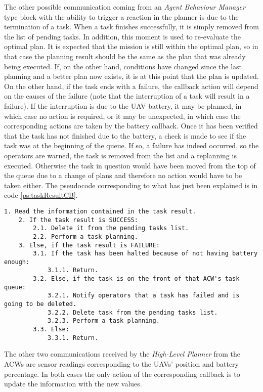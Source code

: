 The other possible communication coming from an \emph{Agent Behaviour Manager} type block with the ability to trigger a reaction in the planner is due to the termination of a task. When a task finishes successfully, it is simply removed from the list of pending tasks. In addition, this moment is used to re-evaluate the optimal plan. It is expected that the mission is still within the optimal plan, so in that case the planning result should be the same as the plan that was already being executed. If, on the other hand, conditions have changed since the last planning and a better plan now exists, it is at this point that the plan is updated. On the other hand, if the task ends with a failure, the callback action will depend on the causes of the failure (note that the interruption of a task will result in a failure). If the interruption is due to the \gls{UAV} battery, it may be planned, in which case no action is required, or it may be unexpected, in which case the corresponding actions are taken by the battery callback. Once it has been verified that the task has not finished due to the battery, a check is made to see if the task was at the beginning of the queue. If so, a failure has indeed occurred, so the operators are warned, the task is removed from the list and a replanning is executed. Otherwise the task in question would have been moved from the top of the queue due to a change of plans and therefore no action would have to be taken either. The pseudocode corresponding to what has just been explained is in code \ref{ps:taskResultCB}.

\begin{lstlisting}[caption={Callback that runs when an \emph{Agent Behaviour Manager} sends a task result}, breaklines=true, label=ps:taskResultCB]
	1. Read the information contained in the task result.
	2. If the task result is SUCCESS:
		2.1. Delete it from the pending tasks list.
		2.2. Perform a task planning.
	3. Else, if the task result is FAILURE:
		3.1. If the task has been halted because of not having battery enough:
			3.1.1. Return.
		3.2. Else, if the task is on the front of that ACW's task queue:
			3.2.1. Notify operators that a task has failed and is going to be deleted.
			3.2.2. Delete task from the pending tasks list.
			3.2.3. Perform a task planning.
		3.3. Else:
			3.3.1. Return.
\end{lstlisting}

The other two communications received by the \emph{High-Level Planner} from the \glspl{ACW} are sensor readings corresponding to the \glspl{UAV}' position and battery percentage. In both cases the only action of the corresponding callback is to update the information with the new values.

